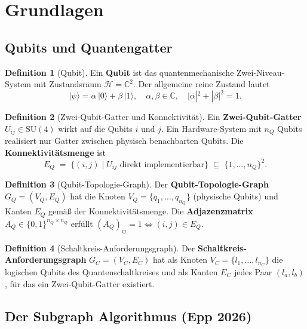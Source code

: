 ﻿\documentclass[a4paper,12pt]{article}
\theoremstyle{definition}
\newtheorem{definition}{Definition}
\begin{document}
\section{Grundlagen}
\label{sec:grundlagen}

\subsection{Qubits und Quantengatter}

\begin{definition}[Qubit]
Ein \textbf{Qubit} ist das quantenmechanische Zwei-Niveau-System mit Zustandsraum
$\mathcal{H} = \mathbb{C}^2$. Der allgemeine reine Zustand lautet
\[
  |\psi\rangle = \alpha\,|0\rangle + \beta\,|1\rangle,\quad
  \alpha,\beta\in\mathbb{C},\quad |\alpha|^2 + |\beta|^2 = 1.
\]
\end{definition}

\begin{definition}[Zwei-Qubit-Gatter und Konnektivität]
Ein \textbf{Zwei-Qubit-Gatter} $U_{ij} \in \mathrm{SU}(4)$ wirkt auf die Qubits $i$
und $j$. Ein Hardware-System mit $n_Q$ Qubits realisiert nur Gatter zwischen physisch
benachbarten Qubits. Die \textbf{Konnektivitätsmenge} ist
\[
  E_Q \;=\; \{(i,j) \mid U_{ij} \text{ direkt implementierbar}\} \;\subseteq\;
  \{1,\ldots,n_Q\}^2.
\]
\end{definition}

\begin{definition}[Qubit-Topologie-Graph]
\label{def:topgraph}
Der \textbf{Qubit-Topologie-Graph} $G_Q = (V_Q, E_Q)$ hat die Knoten
$V_Q = \{q_1,\ldots,q_{n_Q}\}$ (physische Qubits) und Kanten $E_Q$ gemäß der
Konnektivitätsmenge. Die \textbf{Adjazenzmatrix} $A_Q \in \{0,1\}^{n_Q\times n_Q}$
erfüllt $(A_Q)_{ij} = 1 \Leftrightarrow (i,j)\in E_Q$.
\end{definition}

\begin{definition}[Schaltkreis-Anforderungsgraph]
Der \textbf{Schaltkreis-Anforderungsgraph} $G_C = (V_C, E_C)$ hat als Knoten
$V_C = \{l_1,\ldots,l_{n_C}\}$ die logischen Qubits des Quantenschaltkreises und
als Kanten $E_C$ jedes Paar $(l_a,l_b)$, für das ein Zwei-Qubit-Gatter existiert.
\end{definition}

\subsection{Der Subgraph Algorithmus (Epp 2026)}
\end{document}
